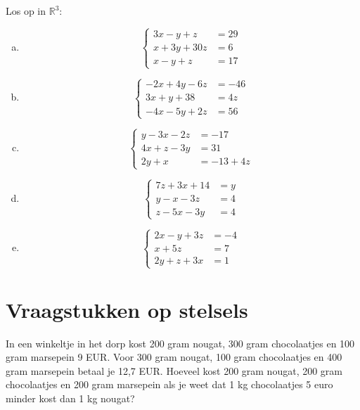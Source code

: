 \documentclass[12pt,twoside]{article}
\begin{document}
\begin{oefening}
Los op in $\mathbb{R}^3$:
\begin{multicols}{2}
\begin{enumerate}[(a)]
  \item$$\left\{
    \begin{aligned}
      3x -  y +  z &= 29\\
      x  + 3y +30z &=  6\\
      x  -  y +  z &= 17
    \end{aligned}\right.$$
  \item$$\left\{
    \begin{aligned}
      -2x + 4y - 6z &= -46\\
       3x +  y + 38 &= 4z\\
      -4x - 5y + 2z &= 56
    \end{aligned}\right.$$
  \item$$\left\{
    \begin{aligned}
       y - 3x - 2z &= -17\\
      4x +  z - 3y &= 31\\
      2y +  x &= -13 + 4z
    \end{aligned}\right.$$
  \item$$\left\{
    \begin{aligned}
      7z + 3x + 14 &= y\\
       y -  x - 3z &= 4\\
       z - 5x - 3y &= 4
    \end{aligned}\right.$$
  \item$$\left\{
    \begin{aligned}
      2x -  y + 3z &= -4\\
       x + 5z      &= 7\\
      2y +  z + 3x &= 1
    \end{aligned}\right.$$
\end{enumerate}
\end{multicols}
\end{oefening}

\pagebreak

\section{Vraagstukken op stelsels}

\begin{oefening}
In een winkeltje in het dorp kost 200 gram nougat, 300 gram chocolaatjes en 100 gram marsepein 
9 EUR.  Voor 300 gram nougat, 100 gram chocolaatjes en 400 gram marsepein betaal je 12,7 EUR.
Hoeveel kost 200 gram nougat, 200 gram chocolaatjes en 200 gram marsepein als je weet dat
1 kg chocolaatjes 5 euro minder kost dan 1 kg nougat?
\end{oefening}
\end{document}
